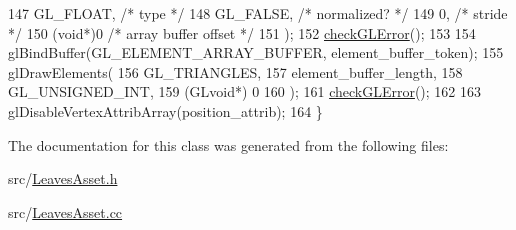 \begin{DoxyCode}
147     GL\_FLOAT,   \textcolor{comment}{/* type */}
148     GL\_FALSE,   \textcolor{comment}{/* normalized? */}
149     0,        \textcolor{comment}{/* stride */}
150     (\textcolor{keywordtype}{void}*)0    \textcolor{comment}{/* array buffer offset */}
151   );
152   \hyperlink{LeavesAsset_8cc_a75f201b0e53e68726854997957322b8d}{checkGLError}();
153 
154   glBindBuffer(GL\_ELEMENT\_ARRAY\_BUFFER, element\_buffer\_token);
155   glDrawElements(
156     GL\_TRIANGLES,
157     element\_buffer\_length,
158     GL\_UNSIGNED\_INT,
159     (GLvoid*) 0
160   );
161   \hyperlink{LeavesAsset_8cc_a75f201b0e53e68726854997957322b8d}{checkGLError}();
162 
163   glDisableVertexAttribArray(position\_attrib);
164 \}
\end{DoxyCode}


The documentation for this class was generated from the following files\+:\begin{DoxyCompactItemize}
\item 
src/\hyperlink{LeavesAsset_8h}{Leaves\+Asset.\+h}\item 
src/\hyperlink{LeavesAsset_8cc}{Leaves\+Asset.\+cc}\end{DoxyCompactItemize}
